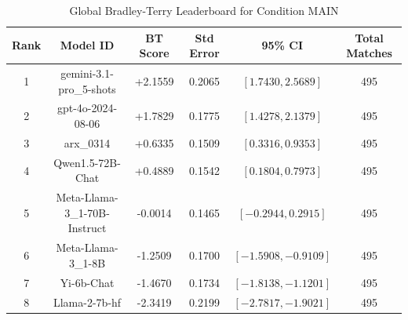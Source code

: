 \begin{table}[ht]
\centering
\caption{Global Bradley-Terry Leaderboard for Condition \textsc{MAIN}}
\label{tab:leaderboard_main}
\begin{tabular}{cccccc}
\hline
\textbf{Rank} & \textbf{Model ID} & \textbf{BT Score} & \textbf{Std Error} & \textbf{95\% CI} & \textbf{Total Matches} \\
\hline
1 & gemini-3.1-pro\_5-shots & +2.1559 & 0.2065 & $[1.7430, 2.5689]$ & 495 \\
2 & gpt-4o-2024-08-06 & +1.7829 & 0.1775 & $[1.4278, 2.1379]$ & 495 \\
3 & arx\_0314 & +0.6335 & 0.1509 & $[0.3316, 0.9353]$ & 495 \\
4 & Qwen1.5-72B-Chat & +0.4889 & 0.1542 & $[0.1804, 0.7973]$ & 495 \\
5 & Meta-Llama-3\_1-70B-Instruct & -0.0014 & 0.1465 & $[-0.2944, 0.2915]$ & 495 \\
6 & Meta-Llama-3\_1-8B & -1.2509 & 0.1700 & $[-1.5908, -0.9109]$ & 495 \\
7 & Yi-6b-Chat & -1.4670 & 0.1734 & $[-1.8138, -1.1201]$ & 495 \\
8 & Llama-2-7b-hf & -2.3419 & 0.2199 & $[-2.7817, -1.9021]$ & 495 \\
\hline
\end{tabular}
\end{table}
